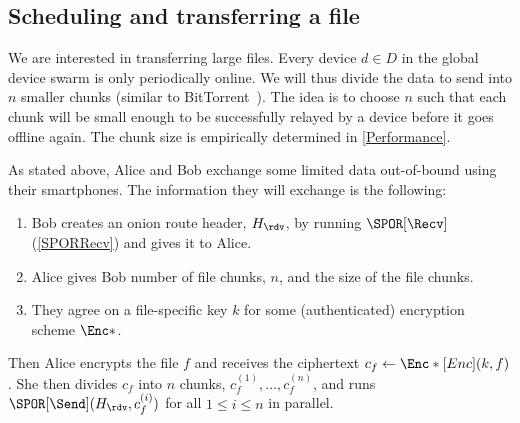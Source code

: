 \subsection{Scheduling and transferring a file}%
\label{sec:file_exchange}

We are interested in transferring large files.
Every device \(d\in D\) in the global device swarm is only periodically online.
We will thus divide the data to send into \(n\) smaller chunks (similar to 
BitTorrent~\cite{BitTorrent}).
The idea is to choose \(n\) such that each chunk will be small enough to be 
successfully relayed by a device before it goes offline again.
The chunk size is empirically determined in \cref{Performance}.

As stated above, Alice and Bob exchange some limited data out-of-bound using 
their smartphones.
The information they will exchange is the following:
\begin{enumerate}
  \item Bob creates an onion route header, \(H_\rdv\), by running 
    \(\SPOR[\Recv]\) (\cref{SPORRecv}) and gives it to Alice.
  \item Alice gives Bob number of file chunks, \(n\), and the size of the file 
    chunks.
  \item They agree on a file-specific key \(k\) for some (authenticated) 
    encryption scheme \(\Enc*\).
\end{enumerate}
Then Alice encrypts the file \(f\) and receives the ciphertext \(c_f\gets 
  \Enc*[Enc](k, f)\).
She then divides \(c_f\) into \(n\) chunks, \(c_f^{(1)}, \dotsc, c_f^{(n)}\), 
and runs \(\SPOR[\Send](H_\rdv, c_f^{(i)})\) for all \(1\leq i\leq n\) in 
parallel.

